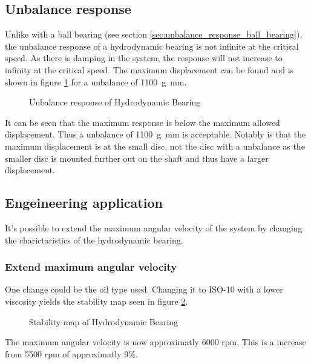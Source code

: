 \subsection{Unbalance response}
Unlike with a ball bearing (see section \ref{sec:unbalance_response_ball_bearing}), the unbalance response of a hydrodynamic bearing is not infinite at the critical speed. As there is damping in the system, the response will not increase to infinity at the critical speed. The maximum displacement can be found and is shown in figure \ref{fig:hydrodynamic_bearing_unbalance_response} for a unbalance of \SI{1100}{\gram \milli \meter}.
\begin{figure}[ht]
    \centering
    
    \caption{Unbalance response of Hydrodynamic Bearing}
    \label{fig:hydrodynamic_bearing_unbalance_response}
\end{figure}
It can be seen that the maximum response is below the maximum allowed displacement. Thus a unbalance of \SI{1100}{\gram \milli \meter} is acceptable. Notably is that the maximum displacement is at the small disc, not the disc with a unbalance as the smaller disc is mounted further out on the shaft and thus have a larger displacement.

\subsection{Engeineering application}
It's possible to extend the maximum angular velocity of the system by changing the charictaristics of the hydrodynamic bearing.

\subsubsection{Extend maximum angular velocity}
One change could be the oil type used. Changing it to ISO-10 with a lower viscosity yields the stability map seen in figure \ref{fig:hydrodynamic_bearing_stability_map}.
\begin{figure}[ht]
    \centering
    
    \caption{Stability map of Hydrodynamic Bearing}
    \label{fig:hydrodynamic_bearing_stability_map}
\end{figure}
The maximum angular velocity is now approximatly 6000 rpm. This is a increase from 5500 rpm of approximatly $9 \%$.